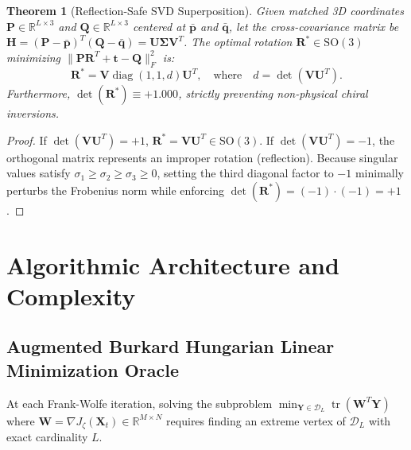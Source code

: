 \documentclass[a4paper,fleqn]{cas-dc}
\theoremstyle{thmstyleone}
\newtheorem{theorem}{Theorem}
\theoremstyle{thmstyletwo}
\theoremstyle{thmstylethree}
\begin{document}
\begin{theorem}[Reflection-Safe SVD Superposition]
\label{thm:kabsch}
Given matched 3D coordinates $\mathbf{P} \in \mathbb{R}^{L \times 3}$ and $\mathbf{Q} \in \mathbb{R}^{L \times 3}$ centered at $\bar{\mathbf{p}}$ and $\bar{\mathbf{q}}$, let the cross-covariance matrix be $\mathbf{H} = (\mathbf{P} - \bar{\mathbf{p}})^T (\mathbf{Q} - \bar{\mathbf{q}}) = \mathbf{U} \mathbf{\Sigma} \mathbf{V}^T$. The optimal rotation $\mathbf{R}^* \in \mathrm{SO}(3)$ minimizing $\|\mathbf{P}\mathbf{R}^T + \mathbf{t} - \mathbf{Q}\|_F^2$ is:
\begin{equation}
\mathbf{R}^* = \mathbf{V} \operatorname{diag}\left(1, 1, d\right) \mathbf{U}^T, \quad \text{where} \quad d = \det(\mathbf{V} \mathbf{U}^T).
\label{eq:kabsch_safe}
\end{equation}
Furthermore, $\det(\mathbf{R}^*) \equiv +1.000$, strictly preventing non-physical chiral inversions.
\end{theorem}
\begin{proof}
If $\det(\mathbf{V}\mathbf{U}^T) = +1$, $\mathbf{R}^* = \mathbf{V}\mathbf{U}^T \in \mathrm{SO}(3)$. If $\det(\mathbf{V}\mathbf{U}^T) = -1$, the orthogonal matrix represents an improper rotation (reflection). Because singular values satisfy $\sigma_1 \ge \sigma_2 \ge \sigma_3 \ge 0$, setting the third diagonal factor to $-1$ minimally perturbs the Frobenius norm while enforcing $\det(\mathbf{R}^*) = (-1) \cdot (-1) = +1$.
\end{proof}

\section{Algorithmic Architecture and Complexity}
\label{sec:algo}

\subsection{Augmented Burkard Hungarian Linear Minimization Oracle}
At each Frank-Wolfe iteration, solving the subproblem $\min_{\mathbf{Y} \in \mathcal{D}_L} \operatorname{tr}(\mathbf{W}^T\mathbf{Y})$ where $\mathbf{W} = \nabla J_\zeta(\mathbf{X}_t) \in \mathbb{R}^{M \times N}$ requires finding an extreme vertex of $\mathcal{D}_L$ with exact cardinality $L$.
\end{document}
